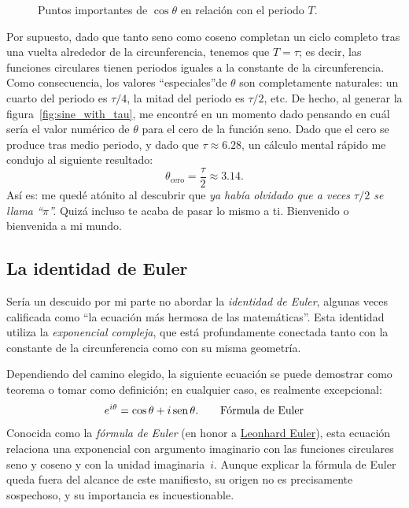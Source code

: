 \begin{figure}
\begin{center}
\end{center}
\caption{Puntos importantes de $\cos\theta$ en relación con el periodo $T$.\label{fig:cosine_with_tau}}
\end{figure}


Por supuesto, dado que tanto seno como coseno completan un ciclo completo tras una vuelta alrededor de la circunferencia, tenemos que $T = \tau$; es decir, las funciones circulares tienen periodos iguales a la constante de la circunferencia. Como consecuencia, los valores ``especiales''de $\theta$ son completamente naturales: un cuarto del periodo es $\tau/4$, la mitad del periodo es $\tau/2$, etc. De hecho, al generar la figura~\ref{fig:sine_with_tau}, me encontré en un momento dado pensando en cuál sería el valor numérico de $\theta$ para el cero de la función seno. Dado que el cero se produce tras medio periodo, y dado que $\tau \approx 6.28$, un cálculo mental rápido me condujo al siguiente resultado:
\[
  \theta_\mathrm{cero} = \frac{\tau}{2} \approx 3.14.
\]
Así es: me quedé atónito al descubrir que \emph{ya había olvidado que a veces $\tau/2$ se llama ``$\pi$''.} Quizá incluso te acaba de pasar lo mismo a ti. Bienvenido o bienvenida a mi mundo.



   \subsection{La identidad de Euler} %
   \label{sec:euler_s_identity}

Sería un descuido por mi parte no abordar la \emph{identidad de Euler}, algunas veces calificada como ``la ecuación más hermosa de las matemáticas''. Esta identidad utiliza la \emph{exponencial compleja}, que está profundamente conectada tanto con la constante de la circunferencia como con su misma geometría.

Dependiendo del camino elegido, la siguiente ecuación se puede demostrar como teorema o tomar como definición; en cualquier caso, es realmente excepcional:
\begin{equation}
\label{eq:eulers_formula}
e^{i\theta} = \cos\theta + i\,\mbox{sen}\,\theta. \qquad\mbox{Fórmula de Euler}
\end{equation}
Conocida como la \emph{fórmula de Euler} (en honor a \href{https://es.wikipedia.org/wiki/Leonhard_Euler}{Leonhard Euler}), esta ecuación relaciona una exponencial con argumento imaginario con las funciones circulares seno y coseno y con la unidad imaginaria~$i$. Aunque explicar la fórmula de Euler queda fuera del alcance de este manifiesto, su origen no es precisamente sospechoso, y su importancia es incuestionable.

